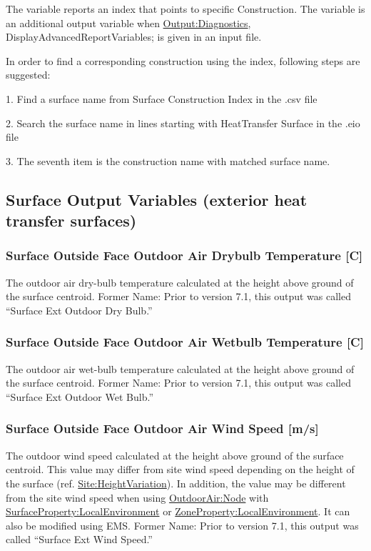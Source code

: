 The variable reports an index that points to specific Construction. The variable is an additional output variable when \hyperref[outputdiagnostics]{Output:Diagnostics}, DisplayAdvancedReportVariables; is given in an input file.

In order to find a corresponding construction using the index, following steps are suggested:

1. Find a surface name from Surface Construction Index in the .csv file

2. Search the surface name in lines starting with HeatTransfer Surface in the .eio file

3. The seventh item is the construction name with matched surface name.

\subsection{Surface Output Variables (exterior heat transfer surfaces)}\label{surface-output-variables-exterior-heat-transfer-surfaces}

\subsubsection{Surface Outside Face Outdoor Air Drybulb Temperature {[}C{]}}\label{surface-outside-face-outdoor-air-drybulb-temperature-c}

The outdoor air dry-bulb temperature calculated at the height above ground of the surface centroid. Former Name: Prior to version 7.1, this output was called ``Surface Ext Outdoor Dry Bulb.''

\subsubsection{Surface Outside Face Outdoor Air Wetbulb Temperature {[}C{]}}\label{surface-outside-face-outdoor-air-wetbulb-temperature-c}

The outdoor air wet-bulb temperature calculated at the height above ground of the surface centroid. Former Name: Prior to version 7.1, this output was called ``Surface Ext Outdoor Wet Bulb.''

\subsubsection{Surface Outside Face Outdoor Air Wind Speed {[}m/s{]}}\label{surface-outside-face-outdoor-air-wind-speed-ms}

The outdoor wind speed calculated at the height above ground of the surface centroid. This value may differ from site wind speed depending on the height of the surface (ref. \hyperref[siteheightvariation]{Site:HeightVariation}). In addition, the value may be different from the site wind speed when using \hyperref[outdoorairnode]{OutdoorAir:Node} with  \hyperref[surfacePropertylocalEnvironment]{SurfaceProperty:LocalEnvironment} or \hyperref[ZonePropertylocalEnvironment]{ZoneProperty:LocalEnvironment}. It can also be modified using EMS. Former Name: Prior to version 7.1, this output was called ``Surface Ext Wind Speed.''

